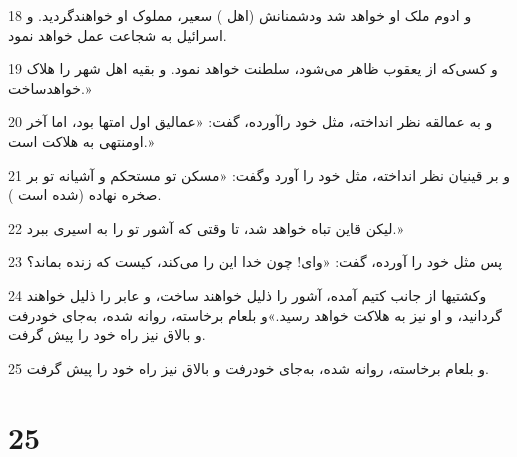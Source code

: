 \par 18 و ادوم ملک او خواهد شد ودشمنانش (اهل ) سعیر، مملوک او خواهندگردید. و اسرائیل به شجاعت عمل خواهد نمود.
\par 19 و کسی‌که از یعقوب ظاهر می‌شود، سلطنت خواهد نمود. و بقیه اهل شهر را هلاک خواهدساخت.»
\par 20 و به عمالقه نظر انداخته، مثل خود راآورده، گفت: «عمالیق اول امتها بود، اما آخر اومنتهی به هلاکت است.»
\par 21 و بر قینیان نظر انداخته، مثل خود را آورد وگفت: «مسکن تو مستحکم و آشیانه تو بر صخره نهاده (شده است ).
\par 22 لیکن قاین تباه خواهد شد، تا وقتی که آشور تو را به اسیری ببرد.»
\par 23 پس مثل خود را آورده، گفت: «وای! چون خدا این را می‌کند، کیست که زنده بماند؟
\par 24 وکشتیها از جانب کتیم آمده، آشور را ذلیل خواهند ساخت، و عابر را ذلیل خواهند گردانید، و او نیز به هلاکت خواهد رسید.»و بلعام برخاسته، روانه شده، به‌جای خودرفت و بالاق نیز راه خود را پیش گرفت.
\par 25 و بلعام برخاسته، روانه شده، به‌جای خودرفت و بالاق نیز راه خود را پیش گرفت.
 
\chapter{25}

